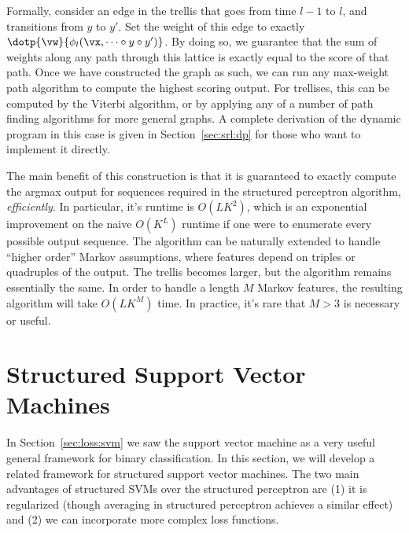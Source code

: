 Formally, consider an edge in the trellis that goes from time $l-1$ to $l$, and transitions from $y$ to $y'$.
Set the weight of this edge to exactly $\dotp{\vw}{\phi_l(\vx, \dots \circ y \circ y')}$.
By doing so, we guarantee that the sum of weights along any path through this lattice is exactly equal to the score of that path.
Once we have constructed the graph as such, we can run any max-weight path algorithm to compute the highest scoring output.
For trellises, this can be computed by the Viterbi algorithm, or by applying any of a number of path finding algorithms for more general graphs.
A complete derivation of the dynamic program in this case is given in Section~\ref{sec:srl:dp} for those who want to implement it directly.

The main benefit of this construction is that it is guaranteed to exactly compute the argmax output for sequences required in the structured perceptron algorithm, \emph{efficiently}.
In particular, it's runtime is $O(LK^2)$, which is an exponential improvement on the naive $O(K^L)$ runtime if one were to enumerate every possible output sequence.
The algorithm can be naturally extended to handle ``higher order'' Markov assumptions, where features depend on triples or quadruples of the output.
The trellis becomes larger, but the algorithm remains essentially the same.
In order to handle a length $M$ Markov features, the resulting algorithm will take $O(LK^M)$ time.
In practice, it's rare that $M>3$ is necessary or useful.





\section{Structured Support Vector Machines}

In Section~\ref{sec:loss:svm} we saw the support vector machine as a very useful general framework for binary classification.
In this section, we will develop a related framework for structured support vector machines.
The two main advantages of structured SVMs over the structured perceptron are (1) it is regularized (though averaging in structured perceptron achieves a similar effect) and (2) we can incorporate more complex loss functions.

